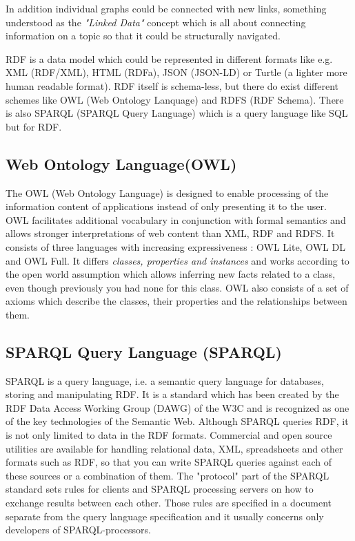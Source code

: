 In addition individual graphs could be connected with new links, something understood as the \textit{"Linked Data"} concept which is all about connecting information on a topic so that it could be structurally navigated.

RDF is a data model which could be represented in different formats like e.g. XML (RDF/XML), HTML (RDFa), JSON (JSON-LD) or Turtle (a lighter more human readable format). RDF itself is schema-less, but there do exist different schemes like OWL (Web Ontology Lanquage) and RDFS (RDF Schema). There is also SPARQL (SPARQL Query Language) which is a query language like SQL but for RDF.

\subsection{Web Ontology Language(OWL)}
The OWL (Web Ontology Language) is designed to enable processing of the information content of applications instead of only presenting it to the user. OWL facilitates additional vocabulary in conjunction with formal semantics and allows stronger interpretations of web content than XML, RDF and RDFS. It consists of three languages with increasing expressiveness : OWL Lite, OWL DL and OWL Full. It differs \textit{classes, properties and instances} and works according to the open world assumption which allows  inferring new facts related to a class, even though previously you had none for this class. OWL also consists of a set of axioms which describe the classes, their properties and the relationships between them.

\subsection{SPARQL Query Language (SPARQL)}
SPARQL is a query language, i.e. a semantic query language for databases, storing and manipulating RDF. It is a standard which has been created by the RDF Data Access Working Group (DAWG) of the W3C and is recognized as one of the key technologies of the Semantic Web. Although SPARQL queries RDF, it is not only limited to data in the RDF formats. Commercial and open source utilities are available for handling relational data, XML, spreadsheets and other formats such as RDF, so that you can write SPARQL queries against each of these sources or a combination of them. The "protocol" part of the SPARQL standard sets rules for clients and SPARQL processing servers on how to exchange results between each other. Those rules are specified in a document separate from the query language specification and it usually concerns only developers of SPARQL-processors.

